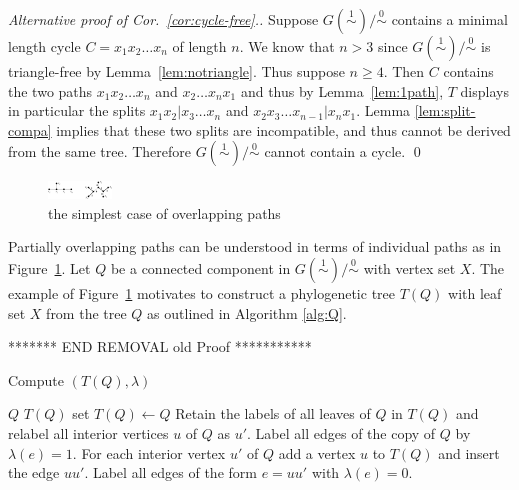 \documentclass[smallextended]{svjour3}
\newcommand{\rev}[1]{\begingroup\color{blue}#1\endgroup}
\newcommand{\remove}[1]{\begingroup\tiny\color{magenta}#1\endgroup}
\newcommand{\Ro}{\mathrel{\overset{0}{\sim}}}
\newcommand{\Rl}{\mathrel{\overset{1}{\sim}}}
\begin{document}
{\begin{proof}[Alternative proof of Cor.\ \ref{cor:cycle-free}.]
  Suppose $G(\Rl)/\Ro$ contains a minimal length cycle $C=x_1x_2\dots x_n$
  of length $n$. We know that $n>3$ since $G(\Rl)/\Ro$ is triangle-free by
  Lemma~\ref{lem:notriangle}. Thus suppose $n\ge 4$. Then $C$ contains the
  two paths $x_1x_2\dots x_n$ and $x_2\dots x_nx_1$ and thus by
  Lemma~\ref{lem:1path}, $T$ displays in particular the splits
  $x_1x_2|x_3\dots x_n$ and $x_2x_3\dots x_{n-1}|x_n x_1$. Lemma
  \ref{lem:split-compa} implies that these two splits are incompatible,
  and thus cannot be derived from the same tree. Therefore $G(\Rl)/\Ro$ cannot
  contain a cycle.
\qed\end{proof}

\begin{figure}
\begin{center}
\includegraphics[width=0.15\textwidth]{quintuple2.eps}
\end{center}
\caption{\remove{the simplest case of overlapping paths}}
\label{fig:quint2}
\end{figure} 

Partially overlapping paths can be understood in terms of individual paths
as in Figure~\ref{fig:quint2}.  Let $Q$ be a connected component in
$G(\Rl)/\Ro$ with vertex set $X$.  The example of Figure~\ref{fig:quint2}
motivates to construct a \rev{phylogenetic tree $T(Q)$ with leaf set $X$}
from the tree $Q$ as outlined in Algorithm \ref{alg:Q}.

******* END REMOVAL old Proof *********** }

\begin{algorithm}
\caption{Compute $(T(Q), \lambda)$}
\label{alg:Q}
\begin{algorithmic}[1]
  \REQUIRE $Q$
  \ENSURE $T(Q)$
  \STATE set $T(Q)\leftarrow Q$ 
  \STATE Retain the labels of all leaves of $Q$ in $T(Q)$ and relabel 
			all interior vertices $u$ of $Q$ as $u'$.
  \STATE Label all edges of the copy of $Q$ by $\lambda(e)=1$.
  \STATE For each interior vertex $u'$ of $Q$ add a vertex $u$ to $T(Q)$ and 
		   insert the edge $uu'$. 
  \STATE Label all edges of the form $e=uu'$ with $\lambda(e)=0$. 
\end{algorithmic}
\end{algorithm}
\end{document}
